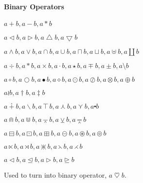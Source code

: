 \paragraph{Binary Operators}
{\LARGE
    $ a + b, a - b, a * b $     %

    $ a \triangleleft b, a \triangleright b, a \bigtriangleup b, a \bigtriangledown b $

    $ a \wedge b,   %
    a \vee b,       %
    a \cap b, a \cup b, a \sqcap b, a \sqcup b, a \uplus b, a \amalg b $

    $ a \div b, a \ast b,      %
    a \times b, a \cdot b, a \star b, a \mp b, a \pm b, a \setminus b $

    $ a \circ b, a \bigcirc b, a \bullet b, a \diamond b, a \odot b, a \oslash b, a \otimes b, a \oplus b $

    $ a \wr b, a \dagger b, a \ddagger b $
}

\vspace{2em}

{\LARGE
    $ a \dotplus b, a \smallsetminus b, a \intercal b, a \curlywedge b, a \curlyvee b, a \centerdot b $

    $ a \Cap b,     %
    a \Cup b,       %
    a \barwedge b, a \veebar b, a \doublebarwedge b $

    $ a \boxminus b, a \boxdot b, a \boxplus b, a \circleddash b, a \circledast b, a \circledcirc b $

    $ a \ltimes b, a \rtimes b, a \divideontimes b, a \leftthreetimes b, a \rightthreetimes b $

    $ a \lhd b, a \unlhd b, a \rhd b, a \unrhd b $
}

Used to turn into binary operator, $ a \mathbin{\heartsuit} b $.

